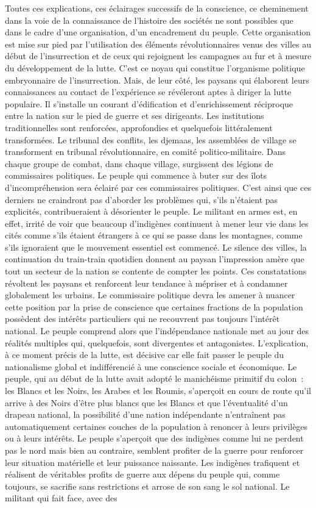 \documentclass[french,twoside]{book} %
\begin{document}
\noindent Toutes ces explications, ces éclairages successifs de la conscience, ce cheminement dans la voie de la connaissance de l’histoire des sociétés ne sont possibles que dans le cadre d’une organisation, d’un encadrement du peuple. Cette organisation est mise sur pied par l’utilisation des éléments révolutionnaires venus des villes au début de l’insurrection et de ceux qui rejoignent les campagnes au fur et à mesure du développement de la lutte. C’est ce noyau qui constitue l’organisme politique embryonnaire de l’insurrection. Mais, de leur côté, les paysans qui élaborent leurs connaissances au contact de l’expérience se révéleront aptes à diriger la lutte populaire. Il s’installe un courant d’édification et d’enrichissement réciproque entre la nation sur le pied de guerre et ses dirigeants. Les institutions traditionnelles sont renforcées, approfondies et quelquefois littéralement transformées. Le tribunal des conflits, les djemaas, les assemblées de village se transforment en tribunal révolutionnaire, en comité politico-militaire. Dans chaque groupe de combat, dans chaque village, surgissent des légions de commissaires politiques. Le peuple qui commence à buter sur des îlots d’incompréhension   sera éclairé par ces commissaires politiques. C’est ainsi que ces derniers ne craindront pas d’aborder les problèmes qui, s’ils n’étaient pas explicités, contribueraient à désorienter le peuple. Le militant en armes est, en effet, irrité de voir que beaucoup d’indigènes continuent à mener leur vie dans les cités comme s’ils étaient étrangers à ce qui se passe dans les montagnes, comme s’ils ignoraient que le mouvement essentiel est commencé. Le silence des villes, la continuation du train-train quotidien donnent au paysan l’impression amère que tout un secteur de la nation se contente de compter les points. Ces constatations révoltent les paysans et renforcent leur tendance à mépriser et à condamner globalement les urbains. Le commissaire politique devra les amener à nuancer cette position par la prise de conscience que certaines fractions de la population possèdent des intérêts particuliers qui ne recouvrent pas toujours l’intérêt national. Le peuple comprend alors que l’indépendance nationale met au jour des réalités multiples qui, quelquefois, sont divergentes et antagonistes. L’explication, à ce moment précis de la lutte, est décisive car elle fait passer le peuple du nationalisme global et indifférencié à une conscience sociale et économique. Le peuple, qui au début de la lutte avait adopté le manichéisme primitif du colon : les Blancs et les Noirs, les Arabes et les Roumis, s’aperçoit en cours de route qu’il arrive à des Noirs d’être plus blancs que les Blancs et que l’éventualité d’un drapeau national, la possibilité d’une nation indépendante n’entraînent pas automatiquement certaines couches de la population à renoncer à leurs privilèges ou à leurs intérêts. Le peuple s’aperçoit que des indigènes comme lui ne perdent pas le nord mais bien au contraire, semblent profiter de la guerre pour renforcer leur situation matérielle et leur puissance naissante. Les indigènes trafiquent et réalisent de véritables profits de guerre aux dépens du peuple qui, comme toujours, se sacrifie sans restrictions et arrose de son sang le sol national. Le militant qui fait face, avec des 
\end{document}
